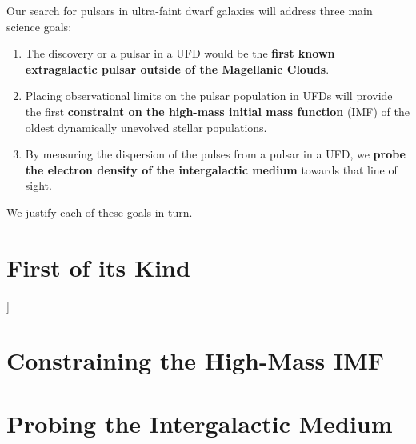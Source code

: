 Our search for pulsars in ultra-faint dwarf galaxies will address three main science goals:
\begin{enumerate}
\item The discovery or a pulsar in a UFD would be the \textbf{first known extragalactic pulsar outside of the Magellanic Clouds}.
\item Placing observational limits on the pulsar population in UFDs will provide the first \textbf{constraint on the high-mass initial mass function} (IMF) of the oldest dynamically unevolved stellar populations.
\item By measuring the dispersion of the pulses from a pulsar in a UFD, we \textbf{probe the electron density of the intergalactic medium} towards that line of sight.
\end{enumerate}
We justify each of these goals in turn.

\section{First of its Kind}
]

\section{Constraining the High-Mass IMF}
%
\section{Probing the Intergalactic Medium}